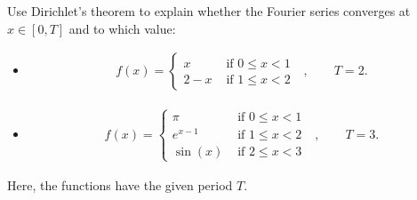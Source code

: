 \documentclass[11pt]{article}
\begin{document}
\begin{exercise}
    Use Dirichlet's theorem to explain whether the Fourier series converges at $x \in [0,T]$ and to which value:
    \begin{itemize}
     \item \begin{gather*}
            f(x) = \left\{\begin{array}{ll}
                            x   & \text{ if $0 \leq x < 1$ }
                            \\
                            2 - x & \text{ if $1 \leq x < 2$ }
                          \end{array}\right., \qquad T = 2.
           \end{gather*}
     \item \begin{gather*}
            f(x) = \left\{\begin{array}{ll}
                            \pi   & \text{ if $0 \leq x < 1$ }
                            \\
                            e^{x-1} & \text{ if $1 \leq x < 2$ }
                            \\
                            \sin(x) & \text{ if $2 \leq x < 3$ }
                          \end{array}\right., \qquad T = 3.
           \end{gather*}
    \end{itemize}
    Here, the functions have the given period $T$.
\end{exercise}
\end{document}
